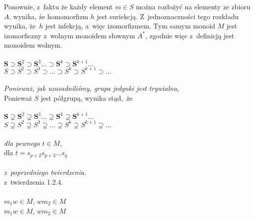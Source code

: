 \documentclass[a4paper,11pt]{article}
\begin{document}
\Powin Ponownie, z~faktu że każdy element $m \in S$ można rozłożyć na
  elementy ze zbioru $A$, wynika, że homomorfizm $h$ jest suriekcją.
  Z~jednoznaczności tego rozkładu wynika, że~$h$ jest infekcją, a~więc
  izomorfizmem. Tym samym monoid $M$ jest izomorficzny z~wolnym monoidem
  słownym $A^{ * }$, zgodnie więc z~definicją jest monoidem wolnym. \\
 \\
\Jest  $\mathbf{S} \supset \mathbf{S}^{ 2 } \supset \mathbf{S}^{ 3 } \ldots
\supset \mathbf{S}^{ k } \supset \mathbf{S}^{ k + 1 } ...$ \\
\Powin $S \supset S^{ 2 } \supset S^{ 3 } \supset \ldots \supset S^{ k } \supset S^{ k + 1 } \supset \ldots$ \\
 \\
\Jest  \textit{Ponieważ, jak uzasadniliśmy, grupa jedynki jest trywialna,}
\\
\Powin Ponieważ $S$ jest półgrupą, wynika stąd,~że \\
 \\
\Jest  $\mathbf{S} \supsetneq \mathbf{S}^{ 2 } \supsetneq \mathbf{S}^{ 3 } \ldots
\supsetneq \mathbf{S}^{ k } \supsetneq \mathbf{S}^{ k + 1 } \ldots$ \\[0.3em]
\Powin $S \supsetneq S^{ 2 } \supsetneq S^{ 3 } \supsetneq \ldots \supsetneq S^{ k } \supsetneq S^{ k + 1 } \supsetneq \ldots$ \\
 \\
\Jest  \textit{dla pewnego $t \in M$,} \\
\Powin dla $t = s_{ p + 2 } s_{ p + 3 } \ldots s_{ q }$ \\
 \\
\Jest  \textit{z~poprzedniego twierdzenia.} \\
\Powin z~twierdzenia 1.2.4. \\
 \\
\Jest  $m_{ 1 } w \in M$,{ } $w m_{ 2 } \in M$ \\
\Powin $m_{ 1 } w \in M$, $w m_{ 2 } \in M$ \\
















{}






\end{document}
